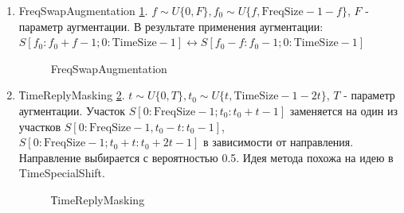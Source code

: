 \documentclass[12pt, fleqn]{article}
\begin{document}
\begin{enumerate}
		\item FreqSwapAugmentation \ref{fig:i16}.
		$f \sim U\{0, F\}, f_0 \sim U\{f,\text{FreqSize} - 1 - f\}$, $F$ - параметр аугментации. \newline
		В результате применения аугментации: \newline
		$S[f_0: f_0 + f - 1; 0:\text{TimeSize} - 1] \leftrightarrow S[f_0 - f: f_0 - 1; 0:\text{TimeSize} -1]$ 
		\begin{figure}[h]
			\caption{FreqSwapAugmentation}
			\label{fig:i16}
		\end{figure}
		\item ТimeReplyMasking \ref{fig:i4}. \newline
		$t \sim U\{0, T\}, t_0 \sim U\{t, \text{TimeSize} - 1 - 2 t\}$, $T$ - параметр аугментации. \newline Участок $S[0:\text{FreqSize} - 1; t_0: t_0 + t - 1]$ заменяется на один из участков \newline $S[0:\text{FreqSize} - 1, t_0 - t: t_0 - 1]$, $S[0:\text{FreqSize} - 1; t_0 + t: t_0 + 2 t -  1]$ в зависимости от направления. Направление выбирается с вероятностью 0.5. Идея метода похожа на идею в TimeSpecialShift.
			\begin{figure}[h]
			\caption{ТimeReplyMasking}
			\label{fig:i4}
		\end{figure}

\end{enumerate}
\end{document}
